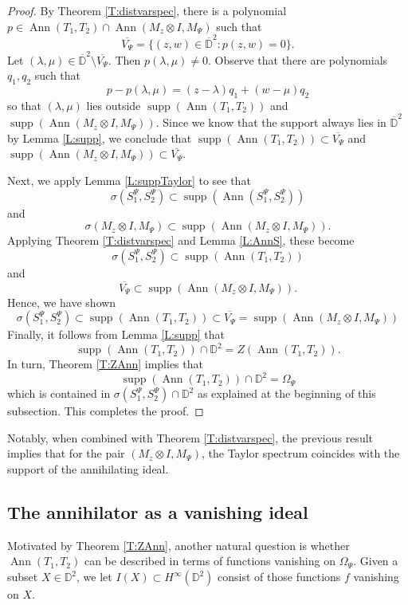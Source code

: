 \documentclass[10pt]{amsart}
\newcommand{\bD}{{\mathbb{D}}}
\newcommand{\ol}{\overline}
\newcommand{\supp}{\operatorname{supp}}
\newcommand{\Ann}{\operatorname{Ann}}
\theoremstyle{definition}
\begin{document}
	 \begin{proof}
	 By Theorem \ref{T:distvarspec}, there is a polynomial $p\in \Ann(T_1,T_2)\cap \Ann(M_z\otimes I,M_\Psi)$ such that
	 \[
	 \ol{V_\Psi}=\{(z,w)\in \ol{\bD}^2:p(z,w)=0\}.
	 \]
	 Let $(\lambda,\mu)\in \ol{\bD}^2\setminus \ol{V_\Psi}$. Then $p(\lambda,\mu)\neq 0$. Observe that there are polynomials $q_1,q_2$ such that
	 \[
	 p-p(\lambda,\mu)=(z-\lambda)q_1+(w-\mu)q_2
	 \]
so that $(\lambda,\mu)$ lies outside $\supp(\Ann(T_1,T_2))$ and $\supp(\Ann(M_z\otimes I,M_\Psi))$. Since we know that the support always lies in $\ol{\bD}^2$  by Lemma \ref{L:supp}, we conclude that $\supp(\Ann(T_1,T_2))\subset \ol{V_\Psi}$ and $\supp(\Ann(M_z\otimes I,M_\Psi))\subset \ol{V_\Psi}$.

Next, we apply Lemma \ref{L:suppTaylor} to see that
\[
\sigma(S^\Psi_1,S^\Psi_2)\subset \supp(\Ann(S^\Psi_1,S^\Psi_2))\]
and
\[\sigma(M_z\otimes I, M_\Psi)\subset \supp(\Ann(M_z\otimes I,M_\Psi)).
\]
Applying Theorem \ref{T:distvarspec} and Lemma \ref{L:AnnS}, these become
\[
\sigma(S^\Psi_1,S^\Psi_2)\subset \supp(\Ann(T_1,T_2))\]
and
\[\ol{V_\Psi}\subset \supp(\Ann(M_z\otimes I,M_\Psi)).
\]
Hence, we have shown
\[
\sigma(S^\Psi_1,S^\Psi_2)\subset \supp(\Ann(T_1,T_2))\subset \ol{V_\Psi}=\supp(\Ann(M_z\otimes I,M_\Psi))
\]
Finally, it follows from Lemma \ref{L:supp} that $$\supp(\Ann(T_1,T_2))\cap\bD^2=Z(\Ann(T_1,T_2)).$$ In turn, Theorem \ref{T:ZAnn} implies that $$\supp(\Ann(T_1,T_2))\cap\bD^2=\Omega_\Psi$$ which is contained in $\sigma( S^\Psi_1,S^\Psi_2)\cap \bD^2$ as explained at the beginning of this subsection. This completes the proof.
\end{proof}
	
Notably, when combined with Theorem \ref{T:distvarspec}, the previous result implies that for the pair $(M_z\otimes I,M_\Psi)$, the Taylor spectrum coincides with the support of the annihilating ideal.  



\subsection{The annihilator as a vanishing ideal}

Motivated by Theorem \ref{T:ZAnn}, another natural question is whether $\Ann(T_1,T_2)$ can be described in terms of functions vanishing on $\Omega_\Psi$. Given a subset $X\in \bD^2$, we let $I(X)\subset H^\infty(\bD^2)$ consist of those functions $f$ vanishing on $X$.
\end{document}
